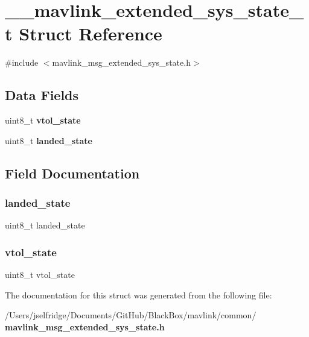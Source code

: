 \section{\+\_\+\+\_\+mavlink\+\_\+extended\+\_\+sys\+\_\+state\+\_\+t Struct Reference}
\label{struct____mavlink__extended__sys__state__t}


{\ttfamily \#include $<$mavlink\+\_\+msg\+\_\+extended\+\_\+sys\+\_\+state.\+h$>$}

\subsection*{Data Fields}
\begin{DoxyCompactItemize}
\item 
uint8\+\_\+t \textbf{ vtol\+\_\+state}
\item 
uint8\+\_\+t \textbf{ landed\+\_\+state}
\end{DoxyCompactItemize}


\subsection{Field Documentation}
\mbox{\label{struct____mavlink__extended__sys__state__t_ac01a423289f4264c877bc50997740280}} 
\subsubsection{landed\+\_\+state}
{\footnotesize\ttfamily uint8\+\_\+t landed\+\_\+state}

\mbox{\label{struct____mavlink__extended__sys__state__t_afb7c9d1adfd47327c135815d5146c8e9}} 
\subsubsection{vtol\+\_\+state}
{\footnotesize\ttfamily uint8\+\_\+t vtol\+\_\+state}



The documentation for this struct was generated from the following file\+:\begin{DoxyCompactItemize}
\item 
/\+Users/jselfridge/\+Documents/\+Git\+Hub/\+Black\+Box/mavlink/common/\textbf{ mavlink\+\_\+msg\+\_\+extended\+\_\+sys\+\_\+state.\+h}\end{DoxyCompactItemize}
